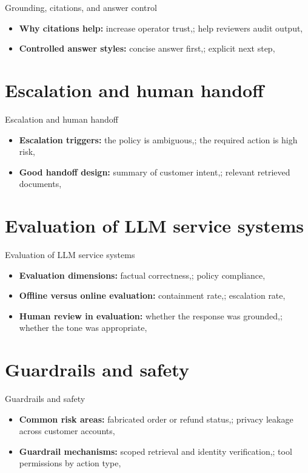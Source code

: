 \documentclass[aspectratio=169]{beamer}
\begin{document}
\begin{frame}{Grounding, citations, and answer control}
  \begin{itemize}
    \item \textbf{Why citations help:} increase operator trust,; help reviewers audit output,
    \item \textbf{Controlled answer styles:} concise answer first,; explicit next step,
  \end{itemize}
\end{frame}

\section{Escalation and human handoff}

\begin{frame}{Escalation and human handoff}
  \begin{itemize}
    \item \textbf{Escalation triggers:} the policy is ambiguous,; the required action is high risk,
    \item \textbf{Good handoff design:} summary of customer intent,; relevant retrieved documents,
  \end{itemize}
\end{frame}

\section{Evaluation of LLM service systems}

\begin{frame}{Evaluation of LLM service systems}
  \begin{itemize}
    \item \textbf{Evaluation dimensions:} factual correctness,; policy compliance,
    \item \textbf{Offline versus online evaluation:} containment rate,; escalation rate,
    \item \textbf{Human review in evaluation:} whether the response was grounded,; whether the tone was appropriate,
  \end{itemize}
\end{frame}

\section{Guardrails and safety}

\begin{frame}{Guardrails and safety}
  \begin{itemize}
    \item \textbf{Common risk areas:} fabricated order or refund status,; privacy leakage across customer accounts,
    \item \textbf{Guardrail mechanisms:} scoped retrieval and identity verification,; tool permissions by action type,
  \end{itemize}
\end{frame}
\end{document}
